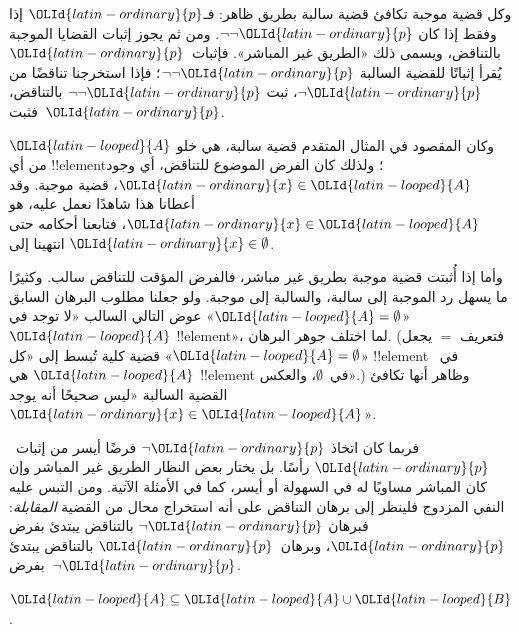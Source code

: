 \documentclass[../../../include/open-logic-section]{subfiles}
\begin{document}
وكل قضية موجبة تكافئ قضية سالبة بطريق ظاهر: فـ$\OLId{latin-ordinary}{p}$ إذا وفقط إذا كان
$\lnot\lnot \OLId{latin-ordinary}{p}$. ومن ثم يجوز إثبات القضايا الموجبة بالتناقض، ويسمى
ذلك «الطريق غير المباشر». فإثبات~$\OLId{latin-ordinary}{p}$ يُقرأ إثباتًا للقضية السالبة
$\lnot\lnot \OLId{latin-ordinary}{p}$؛ فإذا استخرجنا تناقضًا من $\lnot \OLId{latin-ordinary}{p}$، ثبت
$\lnot\lnot \OLId{latin-ordinary}{p}$ بالتناقض، فثبت~$\OLId{latin-ordinary}{p}$.

وكان المقصود في المثال المتقدم قضية سالبة، هي خلو $\OLId{latin-looped}{A}$ من أي
!!{element}؛ ولذلك كان الفرض الموضوع للتناقض، أي وجود $\OLId{latin-ordinary}{x} \in \OLId{latin-looped}{A}$،
قضية موجبة. وقد أعطانا هذا شاهدًا نعمل عليه، هو $\OLId{latin-ordinary}{x} \in \OLId{latin-looped}{A}$، فتابعنا
أحكامه حتى انتهينا إلى $\OLId{latin-ordinary}{x} \in \emptyset$.

وأما إذا أُثبتت قضية موجبة بطريق غير مباشر، فالفرض المؤقت للتناقض
سالب. وكثيرًا ما يسهل رد الموجبة إلى سالبة، والسالبة إلى موجبة. ولو
جعلنا مطلوب البرهان السابق «$\OLId{latin-looped}{A} = \emptyset$» عوض التالي السالب «لا
توجد في $\OLId{latin-looped}{A}$ !!{element}»، لما اختلف جوهر البرهان. (فتعريف $=$ يجعل
«$\OLId{latin-looped}{A} = \emptyset$» قضية كلية تُبسط إلى «كل !!{element} في~$\OLId{latin-looped}{A}$ هي
!!{element} في~$\emptyset$، والعكس».) وظاهر أنها تكافئ القضية السالبة
«ليس صحيحًا أنه يوجد $\OLId{latin-ordinary}{x} \in \OLId{latin-looped}{A}$».

فربما كان اتخاذ $\lnot \OLId{latin-ordinary}{p}$ فرضًا أيسر من إثبات~$\OLId{latin-ordinary}{p}$ رأسًا. بل يختار
بعض النظار الطريق غير المباشر وإن كان المباشر مساويًا له في السهولة
أو أيسر، كما في الأمثلة الآتية. ومن التبس عليه النفي المزدوج فلينظر
إلى برهان التناقض على أنه استخراج محال من القضية \emph{المقابلة}:
فبرهان $\lnot \OLId{latin-ordinary}{p}$ بالتناقض يبتدئ بفرض $\OLId{latin-ordinary}{p}$، وبرهان~$\OLId{latin-ordinary}{p}$ بالتناقض يبتدئ
بفرض~$\lnot \OLId{latin-ordinary}{p}$.

\begin{prop}
$\OLId{latin-looped}{A} \subseteq \OLId{latin-looped}{A} \cup \OLId{latin-looped}{B}$.
\end{prop}
\end{document}
